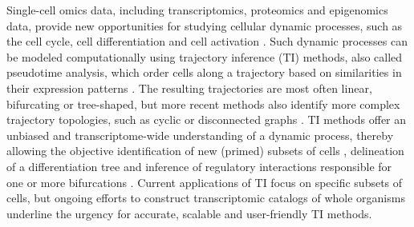 Single-cell omics data, including transcriptomics, proteomics and epigenomics data, provide new opportunities for studying cellular dynamic processes, such as the cell cycle, cell differentiation and cell activation \cite{tanay_scalingsinglecellgenomics_2017,etzrodt_quantitativesinglecellapproaches_2014}. Such dynamic processes can be modeled computationally using trajectory inference (TI) methods, also called pseudotime analysis, which order cells along a trajectory based on similarities in their expression patterns \cite{trapnell_definingcelltypes_2015,cannoodt_computationalmethodstrajectory_2016,moon_manifoldlearningbasedmethods_2018}. The resulting trajectories are most often linear, bifurcating or tree-shaped, but more recent methods also identify more complex trajectory topologies, such as cyclic \cite{liu_reconstructingcellcycle_2017} or disconnected graphs \cite{wolf_graphabstractionreconciles_2017}. TI methods offer an unbiased and transcriptome-wide understanding of a dynamic process\cite{tanay_scalingsinglecellgenomics_2017}, thereby allowing the objective identification of new (primed) subsets of cells \cite{schlitzer_identificationcdc1cdc2committed_2015}, delineation of a differentiation tree \cite{velten_humanhaematopoieticstem_2017,see_mappinghumandc_2017} and inference of regulatory interactions responsible for one or more bifurcations \cite{aibar_scenicsinglecellregulatory_2017}. Current applications of TI focus on specific subsets of cells, but ongoing efforts to construct transcriptomic catalogs of whole organisms \cite{regev_humancellatlas_2017,han_mappingmousecell_2018,schaum_singlecelltranscriptomics20_2018} underline the urgency for accurate, scalable \cite{aibar_scenicsinglecellregulatory_2017,angerer_singlecellsmake_2017} and user-friendly TI methods.

